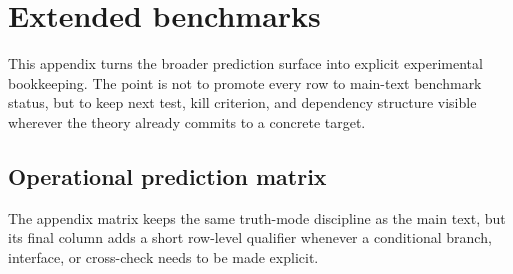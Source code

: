 \documentclass[11pt,a4paper]{article}
\theoremstyle{definition}
\theoremstyle{remark}
\begin{document}
\section{Extended benchmarks}
\label{app:benchmarks}

This appendix turns the broader prediction surface into explicit experimental bookkeeping. The point is not to promote every row to main-text benchmark status, but to keep next test, kill criterion, and dependency structure visible wherever the theory already commits to a concrete target.

\subsection{Operational prediction matrix}

The appendix matrix keeps the same truth-mode discipline as the main text, but its final column adds a short row-level qualifier whenever a conditional branch, interface, or cross-check needs to be made explicit.
\end{document}
